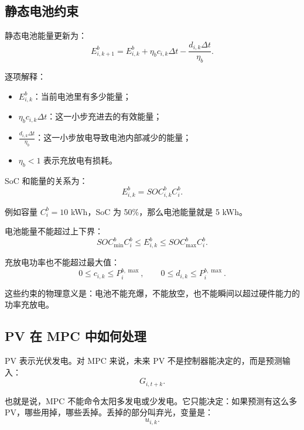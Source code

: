 \documentclass[UTF8,zihao=-4]{ctexart}
\begin{document}
\subsection{静态电池约束}

静态电池能量更新为：
\begin{equation}
E^b_{i,k+1}
=
E^b_{i,k}
+\eta_b c_{i,k}\Delta t
-\frac{d_{i,k}\Delta t}{\eta_b}.
\end{equation}

逐项解释：
\begin{itemize}
  \item $E^b_{i,k}$：当前电池里有多少能量；
  \item $\eta_b c_{i,k}\Delta t$：这一小步充进去的有效能量；
  \item $\frac{d_{i,k}\Delta t}{\eta_b}$：这一小步放电导致电池内部减少的能量；
  \item $\eta_b<1$ 表示充放电有损耗。
\end{itemize}

SoC 和能量的关系为：
\begin{equation}
E^b_{i,k}=SOC^b_{i,k}C^b_i.
\end{equation}

例如容量 $C^b_i=10$ kWh，SoC 为 50\%，那么电池能量就是 5 kWh。

电池能量不能超过上下界：
\begin{equation}
SOC^b_{\min}C^b_i
\le
E^b_{i,k}
\le
SOC^b_{\max}C^b_i.
\end{equation}

充放电功率也不能超过最大值：
\begin{equation}
0\le c_{i,k}\le P^{b,\max}_i,
\qquad
0\le d_{i,k}\le P^{b,\max}_i.
\end{equation}

这些约束的物理意义是：电池不能充爆，不能放空，也不能瞬间以超过硬件能力的功率充放电。

\subsection{PV 在 MPC 中如何处理}

PV 表示光伏发电。对 MPC 来说，未来 PV 不是控制器能决定的，而是预测输入：
\begin{equation}
G_{i,t+k}.
\end{equation}

也就是说，MPC 不能命令太阳多发电或少发电。它只能决定：如果预测有这么多 PV，哪些用掉，哪些丢掉。丢掉的部分叫弃光，变量是：
\begin{equation}
u_{i,k}.
\end{equation}
\end{document}
